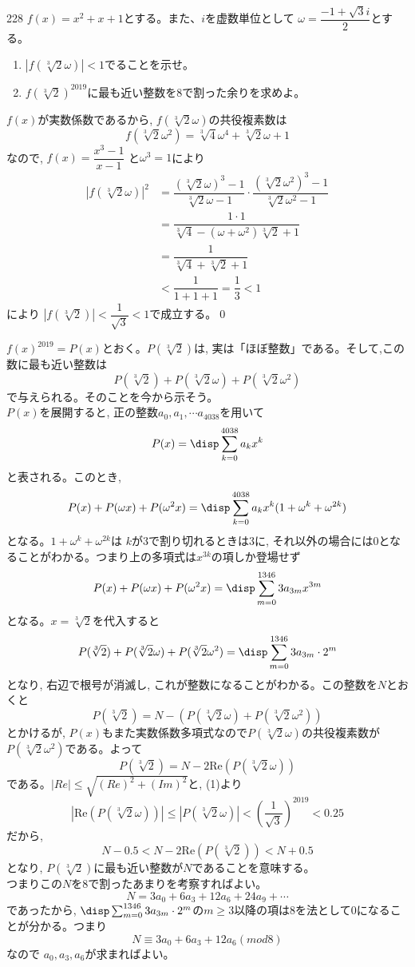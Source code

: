 \begin{prob}{228}{}{}
 $f(x)=x^2+x+1$とする。また、$i$を虚数単位として $\omega=\dfrac{-1+\sqrt{3}i}{2}$とする。
 \begin{enumerate}
  \item $\left|f\left(\sqrt[3]{2}\omega\right)\right|<1$でることを示せ。
  \item $f\left(\sqrt[3]{2}\right)^{2019}$に最も近い整数を8で割った余りを求めよ。
 \end{enumerate}
\end{prob}

$f(x)$が実数係数であるから, $f(\sqrt[3]{2}\omega )$の共役複素数は
\[f(\sqrt[3]{2}\omega^2)=\sqrt[3]{4}\omega^4 +\sqrt[3]{2}\omega +1\]
なので, $f(x)=\dfrac{x^3-1}{x-1}$ と$\omega^3=1$により
\begin{align*}
\left|f\left(\sqrt[3]{2}\omega\right)\right|^2&=\dfrac{(\sqrt[3]{2}\omega)^3-1}{\sqrt[3]{2}\omega-1}\cdot \dfrac{(\sqrt[3]{2}\omega^2)^3-1}{\sqrt[3]{2}\omega^2-1}\\
&=\dfrac{1\cdot 1}{\sqrt[3]{4}-(\omega +\omega^2)\sqrt[3]{2} +1}\\
&= \dfrac{1}{\sqrt[3]{4}+\sqrt[3]{2}+1}\\
&< \dfrac{1}{1+1+1}=\dfrac{1}{3} <1
\end{align*}
により $|f(\sqrt[3]{2})|<\dfrac{1}{\sqrt{3}}<1$で成立する。\qed

$f(x)^{2019}=P(x)$とおく。$P(\sqrt[3]{2})$は, 実は「ほぼ整数」である。そして,この数に最も近い整数は
\[P(\sqrt[3]{2})+P(\sqrt[3]{2}\omega)+P(\sqrt[3]{2}\omega^2)\]
で与えられる。そのことを今から示そう。\\
$P(x)$を展開すると, 正の整数$a_0,a_1,\cdots a_{4038}$を用いて
\[P(x)=\disp\sum_{k=0}^{4038}a_kx^k\]
と表される。このとき,
\[P(x)+P(\omega x)+P(\omega^2 x)=\disp\sum_{k=0}^{4038}a_kx^k(1+\omega^k+\omega^{2k})\]
となる。$1+\omega^k +\omega^{2k}$は $k$が$3$で割り切れるときは$3$に, それ以外の場合には$0$となることがわかる。つまり上の多項式は$x^{3k}$の項しか登場せず
\[P(x)+P(\omega x)+P(\omega^2 x)=\disp\sum_{m=0}^{1346}3a_{3m}x^{3m}\]
となる。$x=\sqrt[3]{2}$を代入すると
\[P(\sqrt[3]{2})+P(\sqrt[3]{2}\omega )+P(\sqrt[3]{2}\omega^2)=\disp\sum_{m=0}^{1346}3a_{3m}\cdot 2^m\]
となり, 右辺で根号が消滅し, これが整数になることがわかる。この整数を$N$とおくと
\[P(\sqrt[3]{2})=N-(P(\sqrt[3]{2}\omega)+P(\sqrt[3]{2}\omega^2))\]
とかけるが, $P(x)$もまた実数係数多項式なので$P(\sqrt[3]{2}\omega )$の共役複素数が$P(\sqrt[3]{2}\omega^2)$である。よって
\[P(\sqrt[3]{2})=N-2\mbox{Re}(P(\sqrt[3]{2}\omega))\]
である。$|Re|\leq \sqrt{(Re)^2+(Im)^2}$と, (1)より
\[|\mbox{Re}(P(\sqrt[3]{2}\omega))|\leq |P(\sqrt[3]{2}\omega)|<\left(\dfrac{1}{\sqrt{3}}\right)^{2019}<0.25\]
だから, 
\[N-0.5<N-2\mbox{Re}(P(\sqrt[3]{2}))<N+0.5\]
となり, $P(\sqrt[3]{2})$に最も近い整数が$N$であることを意味する。\\
つまりこの$N$を8で割ったあまりを考察すればよい。
\[N=3a_0+6a_3+12a_6+24a_9+\cdots\]
であったから, $\disp\sum_{m=0}^{1346}3a_{3m}\cdot 2^m$の$m\geq 3$以降の項は8を法として0になることが分かる。つまり
\[N\equiv 3a_0+6a_3+12a_6　(mod 8)\]
なので $a_0,a_3,a_6$が求まればよい。

